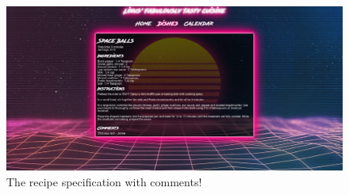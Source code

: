 \documentclass[a4paper]{scrartcl}
\begin{document}
\begin{figure}[H]
  \begin{center}
    \includegraphics[scale=0.25]{Scr5.jpg}
    \caption{The recipe specification with comments!}
    \label{fig:recipe}
  \end{center}
\end{figure}
\end{document}
